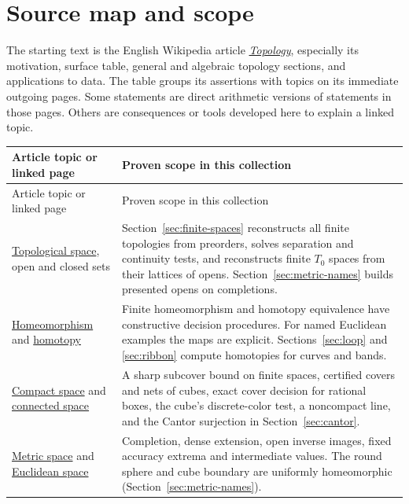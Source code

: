 \section{Source map and scope}\label{sec:sources}
The starting text is the English Wikipedia article \href{https://en.wikipedia.org/wiki/Topology}{\emph{Topology}}, especially its motivation, surface table, general and algebraic topology sections, and applications to data. The table groups its assertions with topics on its immediate outgoing pages. Some statements are direct arithmetic versions of statements in those pages. Others are consequences or tools developed here to explain a linked topic.
\begingroup\small
\renewcommand{\arraystretch}{1.15}
\begin{longtable}{@{}L{.31\linewidth}L{.63\linewidth}@{}}
\toprule
Article topic or linked page & Proven scope in this collection\\
\midrule\endfirsthead
\toprule Article topic or linked page & Proven scope in this collection\\\midrule\endhead
\href{https://en.wikipedia.org/wiki/Topological_space}{Topological space}, open and closed sets & Section~\ref{sec:finite-spaces} reconstructs all finite topologies from preorders, solves separation and continuity tests, and reconstructs finite $T_0$ spaces from their lattices of opens. Section~\ref{sec:metric-names} builds presented opens on completions.\\
\href{https://en.wikipedia.org/wiki/Homeomorphism}{Homeomorphism} and
\href{https://en.wikipedia.org/wiki/Homotopy}{homotopy} & Finite homeomorphism and homotopy equivalence have constructive decision procedures. For named Euclidean examples the maps are explicit. Sections~\ref{sec:loop} and \ref{sec:ribbon} compute homotopies for curves and bands.\\
\href{https://en.wikipedia.org/wiki/Compact_space}{Compact space} and
\href{https://en.wikipedia.org/wiki/Connected_space}{connected space} & A sharp subcover bound on finite spaces, certified covers and nets of cubes, exact cover decision for rational boxes, the cube's discrete-color test, a noncompact line, and the Cantor surjection in Section~\ref{sec:cantor}.\\
\href{https://en.wikipedia.org/wiki/Metric_space}{Metric space} and
\href{https://en.wikipedia.org/wiki/Euclidean_space}{Euclidean space} & Completion, dense extension, open inverse images, fixed accuracy extrema and intermediate values. The round sphere and cube boundary are uniformly homeomorphic (Section~\ref{sec:metric-names}).\\

\end{longtable}

